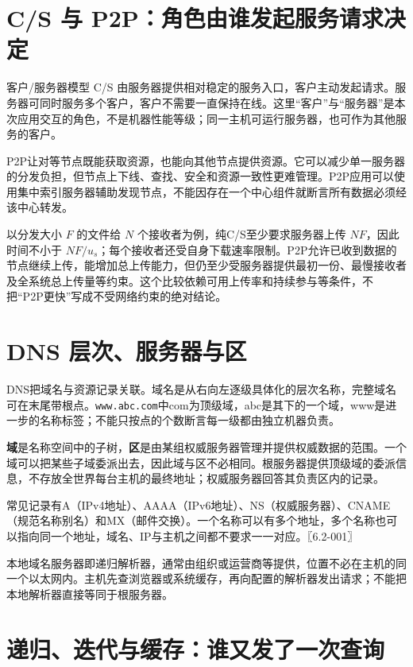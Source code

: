 \section{C/S 与 P2P：角色由谁发起服务请求决定}\label{cn-06-01}

客户/服务器模型 C/S 由服务器提供相对稳定的服务入口，客户主动发起请求。服务器可同时服务多个客户，客户不需要一直保持在线。这里``客户''与``服务器''是本次应用交互的角色，不是机器性能等级；同一主机可运行服务器，也可作为其他服务的客户。

P2P让对等节点既能获取资源，也能向其他节点提供资源。它可以减少单一服务器的分发负担，但节点上下线、查找、安全和资源一致性更难管理。P2P应用可以使用集中索引服务器辅助发现节点，不能因存在一个中心组件就断言所有数据必须经该中心转发。

以分发大小 \(F\) 的文件给 \(N\) 个接收者为例，纯C/S至少要求服务器上传 \(NF\)，因此时间不小于 \(NF/u_s\)；每个接收者还受自身下载速率限制。P2P允许已收到数据的节点继续上传，能增加总上传能力，但仍至少受服务器提供最初一份、最慢接收者及全系统总上传量等约束。这个比较依赖可用上传率和持续参与等条件，不把``P2P更快''写成不受网络约束的绝对结论。

\section{DNS 层次、服务器与区}\label{cn-06-02}

DNS把域名与资源记录关联。域名是从右向左逐级具体化的层次名称，完整域名可在末尾带根点。\allowbreak{}\texttt{www.abc.com}中com为顶级域，abc是其下的一个域，www是进一步的名称标签；不能只按点的个数断言每一级都由独立机器负责。

\textbf{域}是名称空间中的子树，\textbf{区}是由某组权威服务器管理并提供权威数据的范围。一个域可以把某些子域委派出去，因此域与区不必相同。根服务器提供顶级域的委派信息，不存放全世界每台主机的最终地址；权威服务器回答其负责区内的记录。

常见记录有A（IPv4地址）、AAAA（IPv6地址）、NS（权威服务器）、CNAME（规范名称别名）和MX（邮件交换）。一个名称可以有多个地址，多个名称也可以指向同一个地址，域名、IP与主机之间都不要求一一对应。〖6.2-001〗

本地域名服务器即递归解析器，通常由组织或运营商等提供，位置不必在主机的同一个以太网内。主机先查浏览器或系统缓存，再向配置的解析器发出请求；不能把本地解析器直接等同于根服务器。

\section{递归、迭代与缓存：谁又发了一次查询}\label{cn-06-03}

